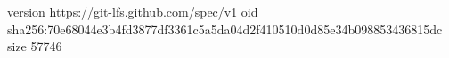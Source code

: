 version https://git-lfs.github.com/spec/v1
oid sha256:70e68044e3b4fd3877df3361c5a5da04d2f410510d0d85e34b098853436815dc
size 57746
